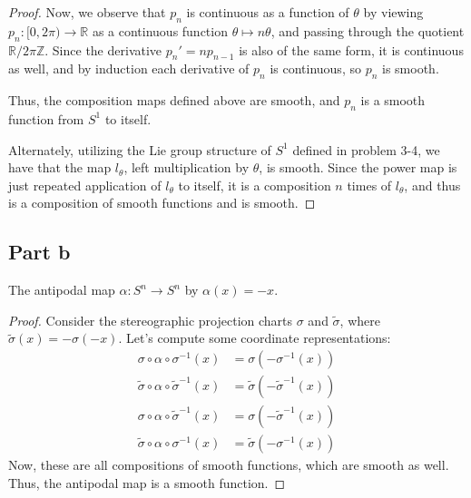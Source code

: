 \documentclass[fontsize=11pt]{scrartcl} %
\numberwithin{equation}{section} %
\numberwithin{figure}{section} %
\numberwithin{table}{section} %
\newcommand{\R}{\mathbb{R}}
\newcommand{\Z}{\mathbb{Z}}
\begin{document}
\begin{proof}
Now, we observe that $p_n$ is continuous as a function of $\theta$ by viewing $p_n:[0,2\pi)\to\R$
as a continuous function $\theta\mapsto n\theta$, and passing through the quotient $\R/{2\pi\Z}$.
Since the derivative $p_n' = np_{n-1}$ is also of the same form, it is continuous as well,
and by induction each derivative of $p_n$ is continuous, so $p_n$ is smooth.

Thus, the composition maps defined above are smooth, and $p_n$ is a smooth function from
$S^1$ to itself.

Alternately, utilizing the Lie group structure of $S^1$ defined in problem 3-4,
we have that the map $l_{\theta}$, left multiplication by $\theta$, is smooth.
Since the power map is just repeated application of $l_{\theta}$ to itself,
it is a composition $n$ times of $l_{\theta}$, and thus is a composition of smooth
functions and is smooth.
\end{proof}

\subsection*{Part b}
The antipodal map $\alpha:S^n\to S^n$ by $\alpha(x) = -x$.
\\
\begin{proof}
Consider the stereographic projection charts $\sigma$ and $\tilde{\sigma}$, where
$\tilde{\sigma}(x) = -\sigma(-x)$. Let's compute some coordinate representations:
\[
\begin{aligned}
\sigma\circ\alpha\circ\sigma^{-1}(x) &= \sigma(-\sigma^{-1}(x))\\
\tilde{\sigma}\circ\alpha\circ\tilde{\sigma}^{-1}(x) &= \tilde{\sigma}(-\tilde{\sigma}^{-1}(x))\\
\sigma\circ\alpha\circ\tilde{\sigma}^{-1}(x) &= \sigma(-\tilde{\sigma}^{-1}(x))\\
\tilde{\sigma}\circ\alpha\circ\sigma^{-1}(x) &= \tilde{\sigma}(-\sigma^{-1}(x))
\end{aligned}
\]
Now, these are all compositions of smooth functions, which are smooth as well.
Thus, the antipodal map is a smooth function. 
\end{proof}
\end{document}
